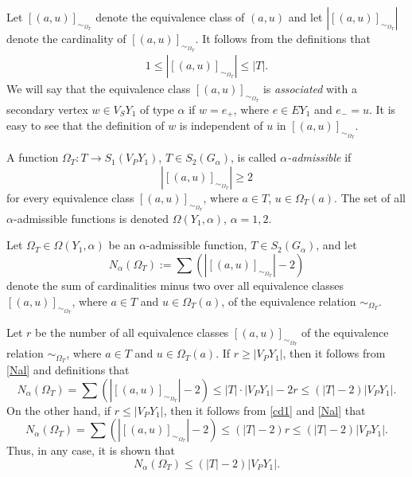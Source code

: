\documentclass[10pt, reqno]{amsart}
\numberwithin{equation}{section}
\begin{document}
Let
$[(a, u)]_{ {\sim}_{{\Omega}_T} }$ denote the equivalence class of $(a, u)$ and let $| [(a, u)]_{ {\sim}_{{\Omega}_T} } |$ denote the cardinality of $[(a, u)]_{ {\sim}_{{\Omega}_T} }$. It follows from the definitions that
\begin{gather}\label{cd1}
1 \le  | [(a, u)]_{ {\sim}_{{\Omega}_T} } | \le |T|   .
\end{gather}
We will say that  the equivalence class  $[(a, u)]_{ {\sim}_{{\Omega}_T} }$ is {\em associated} with a secondary vertex $w \in V_S Y_1$  of type ${\alpha}$ if $w = e_+$, where  $e \in E Y_1$ and  $e_- = u$. It is easy to see that the definition of $w$ is independent of $u$ in  $[(a, u)]_{ {\sim}_{{\Omega}_T} }$.

A function ${\Omega}_T : T \to S_1(V_P Y_1)$, $T \in S_2(G_{\alpha})$, is called
{\em ${\alpha}$-admissible} if
$$
|[ (a, u)  ]_{{\sim}_{{\Omega}_T}} | \ge 2
$$
for every equivalence class $[(a, u)]_{{\sim}_{{\Omega}_T}}$, where $a \in T$, $u \in {\Omega}_T(a)$. The set of all ${\alpha}$-admissible functions is denoted $\Omega(Y_1, {\alpha})$, ${\alpha} =1,2$.

Let ${\Omega}_T \in  \Omega(Y_1, {\alpha})$ be an ${\alpha}$-admissible  function, $T \in S_2(G_{\alpha})$,  and let
\begin{equation}\label{Nal}
N_{\alpha} ( {\Omega}_T ) := \sum ( |  [  (a, u) ]_{{\sim}_{{\Omega}_T}} | -2 )
\end{equation}
denote the sum of cardinalities minus two over all equivalence classes $[(a, u) ]_{{\sim}_{{\Omega}_T}}$, where  $a \in T$ and $u \in {\Omega}_T(a)$, of the equivalence relation ${\sim}_{{\Omega}_T}$.

Let $r$ be the number of all equivalence classes $[(a, u)]_{{\sim}_{{\Omega}_T}}$ of the  equivalence  relation ${\sim}_{{\Omega}_T}$,  where $a \in T$ and $u \in {\Omega}_T(a)$. If $r \ge |V_P Y_1 |$, then it follows from \eqref{Nal} and definitions that
\begin{equation*}
N_{\alpha} ( {\Omega}_T ) = \sum ( |  [  (a, u) ]_{{\sim}_{{\Omega}_T}} | -2 )  \le
     |T|\cdot |V_P Y_1 | - 2r \le (|T| - 2) |V_P Y_1 | .
\end{equation*}
On the other hand, if $r \le |V_P Y_1 |$, then it follows from \eqref{cd1} and \eqref{Nal} that
\begin{equation*}
N_{\alpha} ( {\Omega}_T ) = \sum ( |  [  (a, u) ]_{{\sim}_{{\Omega}_T}} | -2 )  \le
   (|T| -2 ) r   \le (|T| - 2) |V_P Y_1 |  .
\end{equation*}
Thus, in any case, it is shown that
\begin{equation}\label{cd2}
N_{\alpha} ( {\Omega}_T )\le (|T| - 2) |V_P Y_1 |  .
\end{equation}
\end{document}
